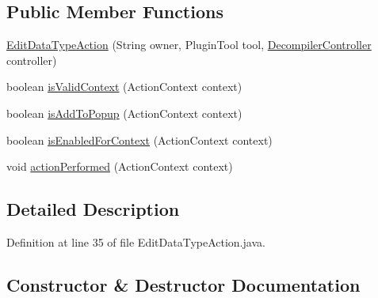 \subsection*{Public Member Functions}
\begin{DoxyCompactItemize}
\item 
\mbox{\hyperlink{classghidra_1_1app_1_1plugin_1_1core_1_1decompile_1_1actions_1_1_edit_data_type_action_a88f509532e50a9e1adbb3ff6f7533ef4}{Edit\+Data\+Type\+Action}} (String owner, Plugin\+Tool tool, \mbox{\hyperlink{classghidra_1_1app_1_1decompiler_1_1component_1_1_decompiler_controller}{Decompiler\+Controller}} controller)
\item 
boolean \mbox{\hyperlink{classghidra_1_1app_1_1plugin_1_1core_1_1decompile_1_1actions_1_1_edit_data_type_action_a037378f65a1a1d024a9772ef029e99dd}{is\+Valid\+Context}} (Action\+Context context)
\item 
boolean \mbox{\hyperlink{classghidra_1_1app_1_1plugin_1_1core_1_1decompile_1_1actions_1_1_edit_data_type_action_a3740c7acec5cdd01522f8d5bb6696a36}{is\+Add\+To\+Popup}} (Action\+Context context)
\item 
boolean \mbox{\hyperlink{classghidra_1_1app_1_1plugin_1_1core_1_1decompile_1_1actions_1_1_edit_data_type_action_a12994abff238287eec91cc98cc89d219}{is\+Enabled\+For\+Context}} (Action\+Context context)
\item 
void \mbox{\hyperlink{classghidra_1_1app_1_1plugin_1_1core_1_1decompile_1_1actions_1_1_edit_data_type_action_a6aab83764bae24945ea130a5bedc2da8}{action\+Performed}} (Action\+Context context)
\end{DoxyCompactItemize}


\subsection{Detailed Description}


Definition at line 35 of file Edit\+Data\+Type\+Action.\+java.



\subsection{Constructor \& Destructor Documentation}
\mbox{\label{classghidra_1_1app_1_1plugin_1_1core_1_1decompile_1_1actions_1_1_edit_data_type_action_a88f509532e50a9e1adbb3ff6f7533ef4}} 
